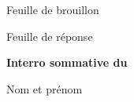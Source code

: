 \documentclass[12pt,french,a4paper,oneside]{article}
\newcommand{\thesubtitle}{Interro sommative du \thedate{}}
\begin{document}
\begin{examcopy}[2]



	\clearpage{}

	\begin{center}
		{\large{Feuille de brouillon}}
	\end{center}

	\clearpage{}

	\AMCformBegin{}
	\begin{center}\Large Feuille de réponse\end{center}

	{\bf \thetitle{}\hspace*{\fill}\thesubtitle{}}

	\vspace{1em}

	Nom et prénom \\
	\namefield{\fbox{\begin{minipage}{\linewidth}%
				\vspace{1cm}\namefielddots{}%
				\vspace*{1mm}%
			\end{minipage}}}

	\vspace{1em}


	\AMCform{}
	\clearpage{}

\end{examcopy}
\end{document}
